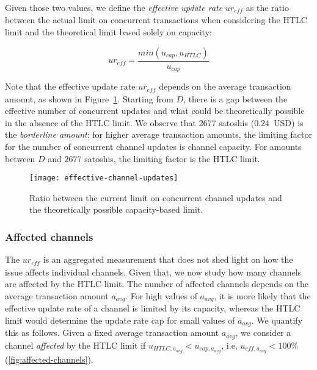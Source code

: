 Given those two values, we define the 
\textit{effective update rate} $ur_\textit{eff}$ as the ratio between the actual limit on concurrent 
transactions when considering the HTLC limit and the theoretical 
limit based solely on capacity:

\[ur_\textit{eff} = \frac{min(u_\textit{cap}, u_\textit{HTLC})}{u_\textit{cap}}\]

Note that the effective update rate $ur_\textit{eff}$ depends on 
the average transaction amount, as shown in Figure~\ref{fig:effective-channel-updates}.
Starting from $D$, there is a gap between the effective number of concurrent updates and what could be theoretically possible in the absence of the HTLC limit. 
We observe that $2677$ satoshis ($0.24$~USD) is the \textit{borderline amount}: for higher average transaction amounts, 
the limiting factor for the number of concurrent channel updates is channel capacity.
For amounts between $D$ and $2677$ satoshis, the limiting factor is the HTLC limit.

\begin{figure}
	\centering
	\texttt{[image: effective-channel-updates]}
	\caption{Ratio between the current limit on concurrent channel updates and the theoretically possible 
	capacity-based limit.\label{fig:effective-channel-updates}}
\end{figure}

\subsubsection*{Affected channels}
The $ur_\textit{eff}$ is an aggregated measurement that does not shed 
light on how the issue affects individual channels.  
Given that, we now study how many channels are affected by the HTLC limit.
The number of affected channels depends on the average transaction amount $a_\textit{avg}$. 
For high values of $a_\textit{avg}$, it is more likely that 
the effective update rate of a channel is limited by its capacity, 
whereas the HTLC limit would determine the update rate cap for small values of $a_\textit{avg}$.
We quantify this as follows.
Given a fixed average transaction amount $a_\textit{avg}$, 
we consider a channel \textit{affected} by the HTLC limit if $u_{\textit{HTLC},a_\textit{avg}} < u_{\textit{cap},a_\textit{avg}}$, i.e, $u_{\textit{eff},a_\textit{avg}} < 100\%$ (\cref{fig:affected-channels}).

